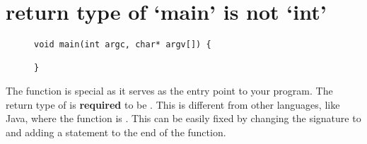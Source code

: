 \section{return type of `main' is not `int'}\label{sec:main-return-type}

\begin{figure}[htb]
\begin{lstlisting}
void main(int argc, char* argv[]) {

}
\end{lstlisting}
\label{ex:main-return-type}
\end{figure}

The  function is special as it serves as the entry point to your program.
The return type of  is \textbf{required} to be .
This is different from other languages, like Java, where the  function is .
This can be easily fixed by changing the signature to  and adding a  statement to the end of the function.
\newpage